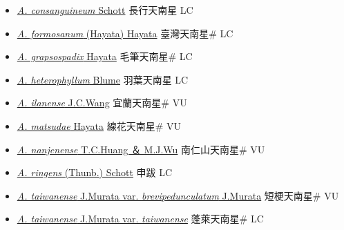 \begin{itemize}
  \begin{itemize}
        \item[] \href{http://www.theplantlist.org/tpl1.1/search?q=Arisaema+consanguineum}{\textit{A. consanguineum} Schott}   長行天南星 LC
        \item[] \href{http://www.theplantlist.org/tpl1.1/search?q=Arisaema+formosanum}{\textit{A. formosanum} (Hayata) Hayata}   臺灣天南星\# LC
        \item[] \href{http://www.theplantlist.org/tpl1.1/search?q=Arisaema+grapsospadix}{\textit{A. grapsospadix} Hayata}   毛筆天南星\# LC
        \item[] \href{http://www.theplantlist.org/tpl1.1/search?q=Arisaema+heterophyllum}{\textit{A. heterophyllum} Blume}   羽葉天南星 LC
        \item[] \href{http://www.theplantlist.org/tpl1.1/search?q=Arisaema+ilanense}{\textit{A. ilanense} J.C.Wang}   宜蘭天南星\# VU
        \item[] \href{http://www.theplantlist.org/tpl1.1/search?q=Arisaema+matsudae}{\textit{A. matsudae} Hayata}   線花天南星\# VU
        \item[] \href{http://www.theplantlist.org/tpl1.1/search?q=Arisaema+nanjenense}{\textit{A. nanjenense} T.C.Huang ＆ M.J.Wu}   南仁山天南星\# VU
        \item[] \href{http://www.theplantlist.org/tpl1.1/search?q=Arisaema+ringens}{\textit{A. ringens} (Thunb.) Schott}   申跋 LC
        \item[] \href{http://www.theplantlist.org/tpl1.1/search?q=Arisaema+taiwanense+var.+brevipedunculatum}{\textit{A. taiwanense} J.Murata var. \textit{brevipedunculatum} J.Murata}   短梗天南星\# VU
        \item[] \href{http://www.theplantlist.org/tpl1.1/search?q=Arisaema+taiwanense+var.+taiwanense}{\textit{A. taiwanense} J.Murata var. \textit{taiwanense}}   蓬萊天南星\# LC

\end{itemize}
\end{itemize}
